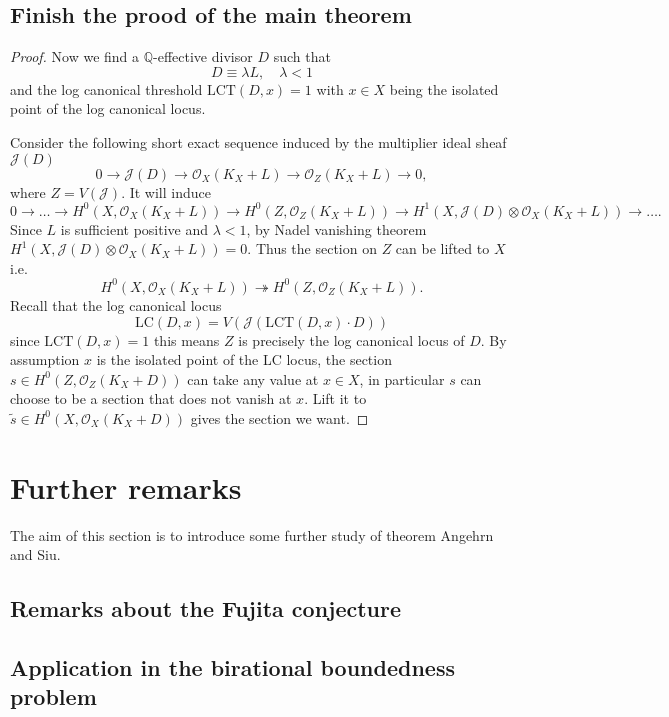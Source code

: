 \documentclass[11pt]{article}
\theoremstyle{definition}
\begin{document}
		\subsection{Finish the prood of the main theorem}
		\begin{proof}
			Now we find a $\mathbb{Q}$-effective divisor $D$ such that $$D \equiv \lambda L , \quad \lambda<1$$and the log canonical threshold $\text{LCT}(D,x) = 1$ with $x\in X$ being the isolated point of the log canonical locus. 
			
			Consider the following short exact sequence induced by the multiplier ideal sheaf $\mathcal{J}(D)$ $$0 \to \mathcal{J}(D) \to \mathcal{O}_X(K_X+L) \to \mathcal{O}_Z(K_X+L)\to 0,$$where $Z = V(\mathcal{J})$. It will induce $$0\to \ldots\to H^0(X,\mathcal{O}_X(K_X+L)) \to H^0(Z,\mathcal{O}_Z(K_X+L))\to H^1(X,\mathcal{J}(D)\otimes \mathcal{O}_X(K_X+L)) \to  \ldots.$$
			Since $L$ is sufficient positive and $\lambda<1$, by Nadel vanishing theorem  $H^1(X,\mathcal{J}(D) \otimes \mathcal{O}_X(K_X+L)) = 0$. Thus the section on $Z$ can be lifted to $X$ i.e. $$H^0(X,\mathcal{O}_X(K_X+L)) \twoheadrightarrow H^0(Z,\mathcal{O}_Z(K_X+L)).$$
			Recall that the log canonical locus $$\text{LC} (D,x) = V(\mathcal{J}(\text{LCT}(D,x)\cdot D))$$since $\text{LCT}(D,x) = 1$ this means $Z$ is precisely the log canonical locus of $D$. By assumption $x$ is the isolated point of the LC locus, the section $s \in H^0(Z,\mathcal{O}_Z(K_X+D))$ can take any value at $x\in X$, in particular $s$ can choose to be a section that does not vanish at $x$. Lift it to $\widetilde{s} \in H^0(X,\mathcal{O}_X(K_X+D))$ gives the section we want.
			
		\end{proof}
		
	\section{Further remarks}
	The aim of this section is to introduce some further study of theorem Angehrn and Siu. 
	
	\subsection{Remarks about the Fujita conjecture}
	\subsection{Application in the birational boundedness problem}
\end{document}
